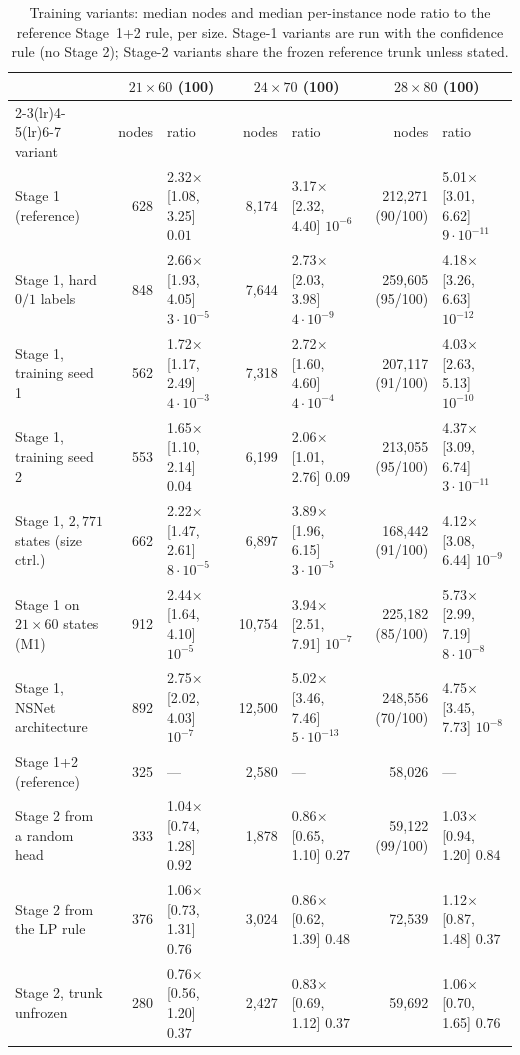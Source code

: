 \begin{table}[t]
\centering
\caption{Training variants: median nodes and median per-instance node ratio to the reference Stage~1+2 rule, per size. Stage-1 variants are run with the confidence rule (no Stage 2); Stage-2 variants share the frozen reference trunk unless stated.}
\label{tab:variants}
\scriptsize
\begin{tabular}{lrlrlrl}
\toprule
 & \multicolumn{2}{c}{$21\times60$ (100)} & \multicolumn{2}{c}{$24\times70$ (100)} & \multicolumn{2}{c}{$28\times80$ (100)} \\
\cmidrule(lr){2-3}\cmidrule(lr){4-5}\cmidrule(lr){6-7}
variant & nodes & ratio & nodes & ratio & nodes & ratio \\
\midrule
Stage 1 (reference) & 628 & 2.32$\times$ [1.08, 3.25] $0.01$ & 8,174 & 3.17$\times$ [2.32, 4.40] $10^{-6}$ & 212,271 (90/100) & 5.01$\times$ [3.01, 6.62] $9\cdot10^{-11}$ \\
Stage 1, hard $0/1$ labels & 848 & 2.66$\times$ [1.93, 4.05] $3\cdot10^{-5}$ & 7,644 & 2.73$\times$ [2.03, 3.98] $4\cdot10^{-9}$ & 259,605 (95/100) & 4.18$\times$ [3.26, 6.63] $10^{-12}$ \\
Stage 1, training seed 1 & 562 & 1.72$\times$ [1.17, 2.49] $4\cdot10^{-3}$ & 7,318 & 2.72$\times$ [1.60, 4.60] $4\cdot10^{-4}$ & 207,117 (91/100) & 4.03$\times$ [2.63, 5.13] $10^{-10}$ \\
Stage 1, training seed 2 & 553 & 1.65$\times$ [1.10, 2.14] $0.04$ & 6,199 & 2.06$\times$ [1.01, 2.76] $0.09$ & 213,055 (95/100) & 4.37$\times$ [3.09, 6.74] $3\cdot10^{-11}$ \\
Stage 1, $2{,}771$ states (size ctrl.) & 662 & 2.22$\times$ [1.47, 2.61] $8\cdot10^{-5}$ & 6,897 & 3.89$\times$ [1.96, 6.15] $3\cdot10^{-5}$ & 168,442 (91/100) & 4.12$\times$ [3.08, 6.44] $10^{-9}$ \\
Stage 1 on $21\times60$ states (M1) & 912 & 2.44$\times$ [1.64, 4.10] $10^{-5}$ & 10,754 & 3.94$\times$ [2.51, 7.91] $10^{-7}$ & 225,182 (85/100) & 5.73$\times$ [2.99, 7.19] $8\cdot10^{-8}$ \\
Stage 1, NSNet architecture & 892 & 2.75$\times$ [2.02, 4.03] $10^{-7}$ & 12,500 & 5.02$\times$ [3.46, 7.46] $5\cdot10^{-13}$ & 248,556 (70/100) & 4.75$\times$ [3.45, 7.73] $10^{-8}$ \\
\midrule
Stage 1+2 (reference) & 325 & --- & 2,580 & --- & 58,026 & --- \\
Stage 2 from a random head & 333 & 1.04$\times$ [0.74, 1.28] $0.92$ & 1,878 & 0.86$\times$ [0.65, 1.10] $0.27$ & 59,122 (99/100) & 1.03$\times$ [0.94, 1.20] $0.84$ \\
Stage 2 from the LP rule & 376 & 1.06$\times$ [0.73, 1.31] $0.76$ & 3,024 & 0.86$\times$ [0.62, 1.39] $0.48$ & 72,539 & 1.12$\times$ [0.87, 1.48] $0.37$ \\
Stage 2, trunk unfrozen & 280 & 0.76$\times$ [0.56, 1.20] $0.37$ & 2,427 & 0.83$\times$ [0.69, 1.12] $0.37$ & 59,692 & 1.06$\times$ [0.70, 1.65] $0.76$ \\
\bottomrule
\end{tabular}
\end{table}